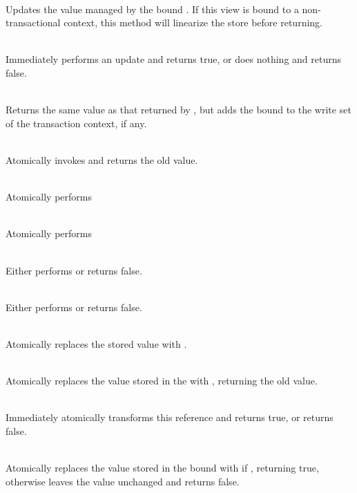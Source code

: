 {\code{) }\\ Updates the value managed by the
bound .  If this view is bound to a non-transactional context,
this method will linearize the store before returning.

\code{): }\\ Immediately
performs an update and returns true, or does nothing and returns false.

\vspace{3pt}

\\ Returns the same value as
that returned by , but adds the bound  to the write
set of the transaction context, if any.

\code{): }\\ Atomically
invokes  and returns the old value.

\code{): }\\
Atomically performs
\code{ \}}

\code{): }\\
Atomically performs
\code{ \}}

\code{): }\\
Either performs  or returns false.

\code{): }\\
Either performs  or returns false.

\code{ => }\code{) }\\
Atomically replaces the stored value  with .

\code{ => }\code{): }\\
Atomically replaces the value  stored in the 
with , returning the old value.

\code{ => }\code{): } \\
Immediately atomically transforms this reference and returns true,
or returns false.

\code{[}\code{,}\code{]):}
\\
Atomically replaces the value  stored in the bound 
with  if , returning true, otherwise
leaves the value unchanged and returns false.

}

